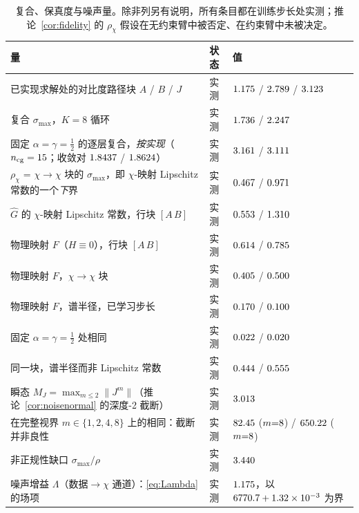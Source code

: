 \documentclass[UTF8,a4paper,11pt]{ctexart}
\newcommand{\norm}[1]{\lVert #1 \rVert}
\newcommand{\numv}[1]{#1}
\begin{document}
\begin{table}[htbp]
\centering
\caption{复合、保真度与噪声量。除非列另有说明，所有条目都在训练步长处实测；推论~\ref{cor:fidelity} 的 $\rho_\chi$ 假设在无约束臂中被否定、在约束臂中未被决定。}
\label{tab:cert2}
\footnotesize\setlength{\tabcolsep}{4pt}
\begin{tabular}{@{}p{}p{}p{}@{}}
\toprule
量 & 状态 & 值 \\
\midrule
已实现求解处的对比度路径块 $A$ / $B$ / $J$ & 实测 & $\numv{\NumSigAImpl}$ / $\numv{\NumSigBImpl}$ / $\numv{\NumSigmaFullImpl}$ \\
复合 $\sigma_{\max}$，$K{=}8$ 循环 & 实测 & $\numv{\NumSigCompCons}$ / $\numv{\NumSigCompUnc}$ \\
\quad 固定 $\alpha=\gamma=\tfrac12$ 的逐层复合，\emph{按实现}（$n_{\mathrm{cg}}=\numv{\NumNCg}$；收敛对 $\numv{\NumGdPhysSigmaConv}$ / $\numv{\NumSigCompLayerConsConv}$） & 实测 & $\numv{\NumSigCompLayerCons}$ / $\numv{\NumSigCompLayerUnc}$ \\
$\rho_\chi$ = $\chi\!\to\!\chi$ 块的 $\sigma_{\max}$，即 $\chi$-映射 Lipschitz 常数的一个\emph{下}界 & 实测 & $\numv{\NumRhoChiCons}$ / $\numv{\NumRhoChiUnc}$ \\
\quad $\hat G$ 的 $\chi$-映射 Lipschitz 常数，行块 $[A\,B]$ & 实测 & $\numv{\NumChiLipRowCons}$ / $\numv{\NumChiLipRowUnc}$ \\
\quad 物理映射 $F$（$H\equiv0$），行块 $[A\,B]$ & 实测 & $\numv{\NumChiLipRowFCons}$ / $\numv{\NumChiLipRowFUnc}$ \\
\quad 物理映射 $F$，$\chi\!\to\!\chi$ 块 & 实测 & $\numv{\NumChiFBlockCons}$ / $\numv{\NumChiFBlockUnc}$ \\
\quad 物理映射 $F$，谱半径，已学习步长 & 实测 & $\numv{\NumChiRhoFCons}$ / $\numv{\NumChiRhoFUnc}$ \\
\quad 固定 $\alpha=\gamma=\tfrac12$ 处相同 & 实测 & $\numv{\NumChiRhoFFixCons}$ / $\numv{\NumChiRhoFFixUnc}$ \\
\quad 同一块，谱半径而非 Lipschitz 常数 & 实测 & $\numv{\NumRhoChiSpecCons}$ / $\numv{\NumRhoChiSpecUnc}$ \\
瞬态 $M_J=\max_{m\le2}\norm{J^m}$（推论~\ref{cor:noisenormal} 的深度-2 截断） & 实测 & $\numv{\NumMJCons}$ \\
\quad 在完整视界 $m\in\{1,2,4,8\}$ 上的相同：截断并非良性 & 实测 & $\numv{\NumMJFullCons}$ ($m{=}\numv{\NumMJFullArgmaxM}$) / $\numv{\NumMJFullUnc}$ ($m{=}\numv{\NumMJFullArgmaxMUnc}$) \\
非正规性缺口 $\sigma_{\max}/\rho$ & 实测 & $\numv{\NumGapRatio}$ \\
噪声增益 $\Lambda$（数据$\to\chi$ 通道）：\eqref{eq:Lambda} 的场项 & 实测 & $\numv{\NumLambdaMeas}$，以 $\numv{\NumLambdaBound}+\numv{\NumLamCorrTerm}$ 为界 \\
\bottomrule
\end{tabular}
\end{table}
\end{document}
